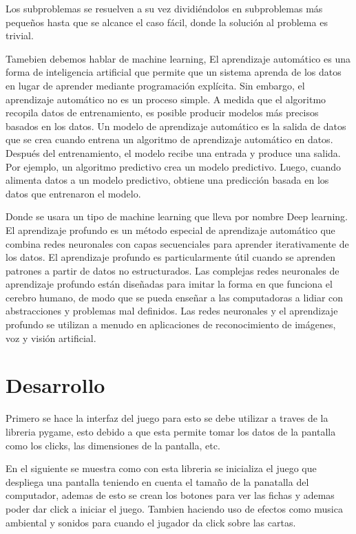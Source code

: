 \documentclass[10pt,twocolumn]{article}
\begin{document}
Los subproblemas se resuelven a su vez dividiéndolos en subproblemas más pequeños hasta que se alcance el caso fácil, donde la solución al problema es trivial.

Tamebien debemos hablar de machine learning, El aprendizaje automático es una forma de inteligencia artificial que permite que un sistema aprenda de los datos en lugar de aprender mediante programación explícita. Sin embargo, el aprendizaje automático no es un proceso simple. A medida que el algoritmo recopila datos de entrenamiento, es posible producir modelos más precisos basados ​​en los datos. Un modelo de aprendizaje automático es la salida de datos que se crea cuando entrena un algoritmo de aprendizaje automático en datos. Después del entrenamiento, el modelo recibe una entrada y produce una salida. Por ejemplo, un algoritmo predictivo crea un modelo predictivo. Luego, cuando alimenta datos a un modelo predictivo, obtiene una predicción basada en los datos que entrenaron el modelo.

Donde se usara un tipo de machine learning que lleva por nombre Deep learning. El aprendizaje profundo es un método especial de aprendizaje automático que combina redes neuronales con capas secuenciales para aprender iterativamente de los datos. El aprendizaje profundo es particularmente útil cuando se aprenden patrones a partir de datos no estructurados. Las complejas redes neuronales  de aprendizaje profundo están diseñadas para imitar la forma en que funciona el cerebro humano, de modo que se pueda enseñar a las computadoras a lidiar con abstracciones y problemas mal definidos. Las redes neuronales y el aprendizaje profundo se utilizan a menudo en aplicaciones de reconocimiento de imágenes, voz y  visión artificial.


\section{Desarrollo }

Primero se hace la interfaz del juego para esto se debe utilizar a traves de la libreria pygame, esto debido a que esta permite tomar los datos de la pantalla como los clicks, las dimensiones de la pantalla, etc.

En el siguiente se muestra como con esta libreria se inicializa el juego que despliega una pantalla teniendo en cuenta el tamaño de la panatalla del computador, ademas de esto se crean los botones para ver las fichas y ademas poder dar click a iniciar el juego. Tambien haciendo uso de efectos como musica ambiental y sonidos para cuando el jugador da click sobre las cartas.
\end{document}

